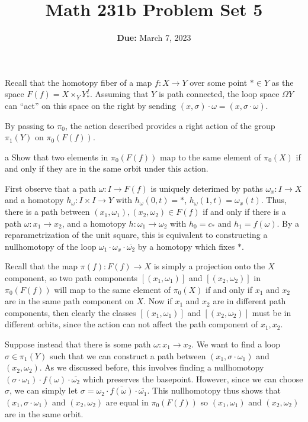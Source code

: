 \documentclass[11pt,letterpaper]{article}
\title{\textbf{Math 231b Problem Set 5}}
\date{\textbf{Due:} March 7, 2023}
\begin{document}
\maketitle

\begin{problem}
    Recall that the homotopy fiber of a map $f : X\to Y$ over some point $*\in Y$ as the space $F(f) = X\times_Y Y^I_*$. Assuming that $Y$ is path connected, the loop space $\Omega Y$ can ``act'' on this space on the right by sending $(x,\sigma)\cdot \omega = (x,\sigma\cdot \omega)$.
\end{problem}

\begin{solution}
    \quad By passing to $\pi_0$, the action described provides a right action of the group $\pi_1(Y)$ on $\pi_0(F(f))$.
    \begin{partproblem}{a}
        Show that two elements in $\pi_0(F(f))$ map to the same element of $\pi_0(X)$ if and only if they are in the same orbit under this action.
    \end{partproblem}

    \quad First observe that a path $\omega : I \to F(f)$ is uniquely deterimed by paths $\omega_x : I \to X$ and a homotopy $h_\omega :I\times I \to Y$ with $h_\omega(0,t)=*$, $h_\omega(1,t) = \omega_x(t)$. Thus, there is a path between $(x_1,\omega_1), (x_2, \omega_2)\in F(f)$ if and only if there is a path $\omega : x_1 \to x_2$, and a homotopy $h : \omega_1 \to \omega_2$ with $h_0 = c_*$ and $h_1 = f(\omega)$. By a reparametrization of the unit square, this is equivalent to constructing a nullhomotopy of the loop $\omega_1\cdot \omega_x\cdot \overline{\omega_2}$ by a homotopy which fixes $*$.
    
    \quad Recall that the map $\pi(f) : F(f) \to X$ is simply a projection onto the $X$ component, so two path components $[(x_1, \omega_1)]$ and $[(x_2, \omega_2)]$ in $\pi_0(F(f))$ will map to the same element of $\pi_0(X)$ if and only if $x_1$ and $x_2$ are in the same path component on $X$. Now if $x_1$ and $x_2$ are in different path components, then clearly the classes $[(x_1, \omega_1)]$ and $[(x_2, \omega_2)]$ must be in different orbits, since the action can not affect the path component of $x_1, x_2$. 
    
    \quad Suppose instead that there is some path $\omega : x_1 \to x_2$. We want to find a loop $\sigma \in \pi_1(Y)$ such that we can construct a path between $(x_1,\sigma\cdot\omega_1)$ and $(x_2, \omega_2)$. As we discussed before, this involves finding a nullhomotopy $(\sigma\cdot\omega_1)\cdot f(\omega)\cdot \overline{\omega_2}$ which preserves the basepoint. However, since we can choose $\sigma$, we can simply let $\sigma = \omega_2\cdot\overline{f(\omega)}\cdot \overline{\omega_1}$. This nullhomotopy thus shows that $(x_1,\sigma\cdot \omega_1)$ and $(x_2,\omega_2)$ are equal in $\pi_0(F(f))$ so $(x_1,\omega_1)$ and $(x_2,\omega_2)$ are in the same orbit.


\end{solution}
\end{document}
